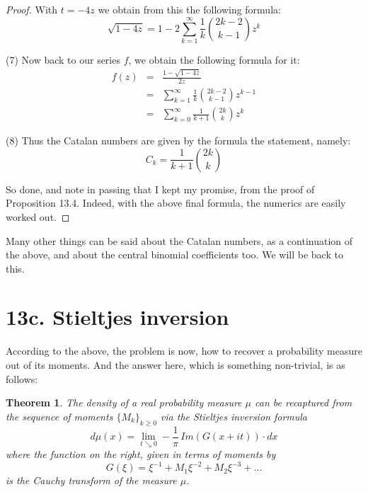\documentclass[12pt]{amsbook}
\newtheorem{theorem}{Theorem}[chapter]
\begin{document}
\begin{proof}
With $t=-4z$ we obtain from this the following formula:
$$\sqrt{1-4z}=1-2\sum_{k=1}^\infty\frac{1}{k}\binom{2k-2}{k-1}z^k$$

(7) Now back to our series $f$, we obtain the following formula for it:
\begin{eqnarray*}
f(z)
&=&\frac{1-\sqrt{1-4z}}{2z}\\
&=&\sum_{k=1}^\infty\frac{1}{k}\binom{2k-2}{k-1}z^{k-1}\\
&=&\sum_{k=0}^\infty\frac{1}{k+1}\binom{2k}{k}z^k
\end{eqnarray*}

(8) Thus the Catalan numbers are given by the formula the statement, namely:
$$C_k=\frac{1}{k+1}\binom{2k}{k}$$

So done, and note in passing that I kept my promise, from the proof of Proposition 13.4. Indeed, with the above final formula, the numerics are easily worked out.
\end{proof}

Many other things can be said about the Catalan numbers, as a continuation of the above, and about the central binomial coefficients too. We will be back to this.

\section*{13c. Stieltjes inversion}

According to the above, the problem is now, how to recover a probability measure out of its moments. And the answer here, which is something non-trivial, is as follows:


\begin{theorem}
The density of a real probability measure $\mu$ can be recaptured from the sequence of moments $\{M_k\}_{k\geq0}$ via the Stieltjes inversion formula
$$d\mu (x)=\lim_{t\searrow 0}-\frac{1}{\pi}\,Im\left(G(x+it)\right)\cdot dx$$
where the function on the right, given in terms of moments by
$$G(\xi)=\xi^{-1}+M_1\xi^{-2}+M_2\xi^{-3}+\ldots$$
is the Cauchy transform of the measure $\mu$.
\end{theorem}
\end{document}
